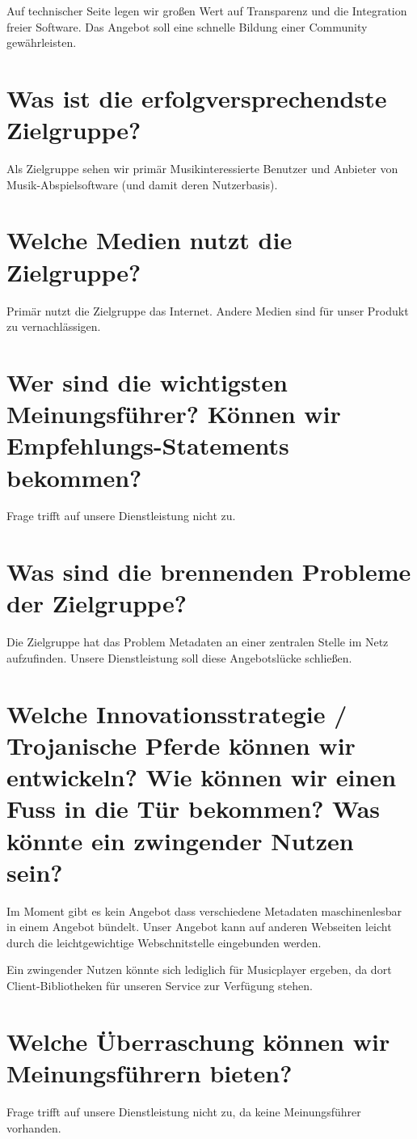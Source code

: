 \documentclass[11pt]{scrreprt}
\begin{document}
Auf technischer Seite legen wir großen Wert auf Transparenz und die Integration
freier Software. Das Angebot soll eine schnelle Bildung einer Community
gewährleisten.



\section{Was ist die erfolgversprechendste Zielgruppe?}
Als Zielgruppe sehen wir primär Musikinteressierte Benutzer und Anbieter von
Musik-Abspielsoftware (und damit deren Nutzerbasis).


\section{Welche Medien nutzt die Zielgruppe?}
Primär nutzt die Zielgruppe das Internet. Andere Medien sind für unser Produkt
zu vernachlässigen.


\section{Wer sind die wichtigsten Meinungsführer?
Können wir Empfehlungs-Statements bekommen?}
Frage trifft auf unsere Dienstleistung nicht zu.



\section{Was sind die brennenden Probleme der
Zielgruppe?}
Die Zielgruppe hat das Problem Metadaten an einer zentralen Stelle im Netz
aufzufinden. Unsere Dienstleistung soll diese Angebotslücke schließen.


\section{Welche Innovationsstrategie / Trojanische Pferde können wir entwickeln?
    Wie können wir einen Fuss in die Tür bekommen?
Was könnte ein zwingender Nutzen sein?}
Im Moment gibt es kein Angebot dass verschiedene Metadaten maschinenlesbar 
in einem Angebot bündelt. Unser Angebot kann auf anderen Webseiten leicht durch
die leichtgewichtige Webschnitstelle eingebunden werden.

Ein zwingender Nutzen könnte sich lediglich für Musicplayer ergeben, da dort 
Client-Bibliotheken für unseren Service zur Verfügung stehen. 

\section{Welche Überraschung können wir
Meinungsführern bieten?}
Frage trifft auf unsere Dienstleistung nicht zu, da keine Meinungsführer
vorhanden.
\end{document}
